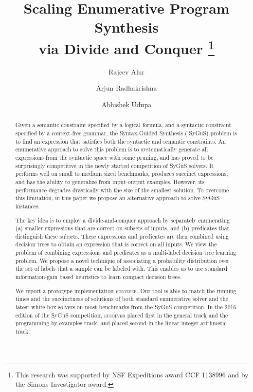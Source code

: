 \documentclass{llncs}
\newcommand\arsays[1]{{\color{red} \bf AR: #1}}
\newcommand{\sygus}{{\sffamily\fontsize{8.5}{10}\selectfont
    SyGuS}\xspace}
\newcommand{\eusolver}{\textsc{eusolver}\xspace}
\begin{document}


\pagestyle{plain}
\title{
  \texorpdfstring{Scaling Enumerative Program Synthesis\\via
    Divide and Conquer}{Scaling Enumerative Program Synthesis via Divide and Conquer}
  \thanks{This research was supported by NSF Expeditions award CCF
  1138996 and by the Simons Investigator award.}
  }
\author{Rajeev Alur \and Arjun Radhakrishna \and Abhishek Udupa}
\maketitle

\begin{abstract}
  Given a semantic constraint specified by a logical formula, and
  a syntactic constraint specified by a context-free grammar, the
  Syntax-Guided Synthesis (\sygus) problem is to find an expression
  that satisfies both the syntactic and semantic constraints.
  An enumerative approach to solve this problem is to systematically
  generate all expressions from the syntactic space with some pruning,
  and has proved to be surprisingly competitive in the newly started
  competition of \sygus solvers.  It performs well on small to medium sized
  benchmarks, produces succinct expressions, and has the ability to
  generalize from input-output examples.  However, its performance
  degrades drastically with the size of the smallest solution. To overcome
  this limitation, in this paper we propose an alternative approach to
  solve \sygus instances.

  The key idea  is to employ a divide-and-conquer approach by
  separately enumerating (a) smaller expressions that are correct on
  subsets of inputs, and (b) predicates that distinguish these
  subsets.  These expressions and predicates are then combined
  using decision trees to obtain an expression that is correct on all
  inputs.  We view the problem of combining expressions and predicates as
  a multi-label decision tree learning problem. We propose a novel
  technique of associating a probability distribution over the set of
  labels that a sample can be labeled with. This enables us to use
  standard information-gain based heuristics to learn compact decision
  trees.

  We report a prototype implementation \eusolver. Our tool is able to
  match the running times and the succinctness of solutions of both
  standard enumerative solver and the latest white-box solvers on
  most benchmarks from the \sygus competition. In the 2016 edition of
  the \sygus competition, \eusolver placed first in the general track
  and the programming-by-examples track, and placed second in the linear
  integer arithmetic track.
\end{abstract}
\end{document}
